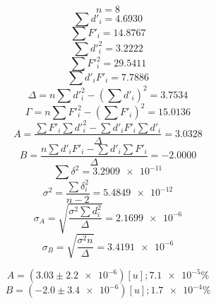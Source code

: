 \documentclass[letter,11pt]{article}
\begin{document}
\begin{equation*}
    n = 8
\end{equation*}
\begin{equation*}
    \sum d'_i = 4.6930
\end{equation*}
\begin{equation*}
    \sum F'_i = 14.8767
\end{equation*}
\begin{equation*}
    \sum d'^2_i = 3.2222
\end{equation*}
\begin{equation*}
    \sum F'^2_i = 29.5411
\end{equation*}
\begin{equation*}
    \sum d'_i F'_i = 7.7886
\end{equation*}
\begin{equation*}
    \Delta = n \sum d'^2_i - \left( \sum d'_i \right)^2 = 3.7534
\end{equation*}
\begin{equation*}
    \Gamma = n \sum F'^2_i - \left( \sum F'_i \right)^2 = 15.0136
\end{equation*}
\begin{equation*}
    A = \frac{\sum F'_i \sum d'^2_i - \sum d'_i F'_i \sum d'_i}{\Delta} = 3.0328
\end{equation*}
\begin{equation*}
    B = \frac{n \sum d'_i F'_i - \sum d'_i \sum F'_i}{\Delta} = -2.0000
\end{equation*}
\begin{equation*}
    \sum \delta^2 = \num{3.2909e-11}
\end{equation*}
\begin{equation*}
    \sigma^2 = \frac{\sum \delta^2_i}{n-2} = \num{5.4849e-12}
\end{equation*}
\begin{equation*}
    \sigma_A = \sqrt{\frac{\sigma^2 \sum d^2_i}{\Delta}} = \num{2.1699e-6}
\end{equation*}
\begin{equation*}
    \sigma_B = \sqrt{\frac{\sigma^2 n}{\Delta}} = \num{3.4191e-6}
\end{equation*}

\begin{equation*}
    A = (3.03 \pm \num{2.2e-6})[u]; \num{7.1e-5}\%
\end{equation*}
\begin{equation*}
    B = (-2.0 \pm \num{3.4e-6})[u]; \num{1.7e-4}\%
\end{equation*}
\end{document}
